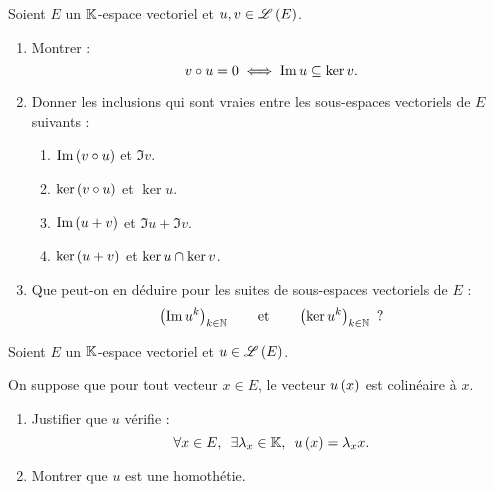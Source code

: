 \begin{exo}
Soient \(E\) un \(\mathbb{K}\)-espace vectoriel et \(u,v\in\mathscr{L}\left(E\right)\).

\begin{enumerate}
\item Montrer : \[v\circ u=0\iff\operatorname{Im} u\subseteq\ker v.\]

\item Donner les inclusions qui sont vraies entre les sous-espaces vectoriels de \(E\) suivants :

\begin{enumerate}
\item \(\operatorname{Im}\left(v\circ u\right)\) et \(\Im v\). \\

\item \(\ker\left(v\circ u\right)\) et \(\ker u\). \\

\item \(\operatorname{Im}\left(u+v\right)\) et \(\Im u+\Im v\). \\

\item \(\ker\left(u+v\right)\) et \(\ker u\cap\ker v\). \\
\end{enumerate}

\item Que peut-on en déduire pour les suites de sous-espaces vectoriels de \(E\) : \[\left(\operatorname{Im} u^k\right)_{k\in\mathbb{N}}\qquad\text{et}\qquad\left(\ker u^k\right)_{k\in\mathbb{N}}\text{ ?}\]
\end{enumerate}
\end{exo}

\begin{corr}
\end{corr}

\begin{exo}
Soient \(E\) un \(\mathbb{K}\)-espace vectoriel et \(u\in\mathscr{L}\left(E\right)\).

On suppose que pour tout vecteur \(x\in E\), le vecteur \(u\left(x\right)\) est colinéaire à \(x\).

\begin{enumerate}
\item Justifier que \(u\) vérifie : \[\quantifs{\forall x\in E;\exists\lambda_x\in\K}u\paren{x}=\lambda_xx.\]

\item Montrer que \(u\) est une homothétie.
\end{enumerate}
\end{exo}

